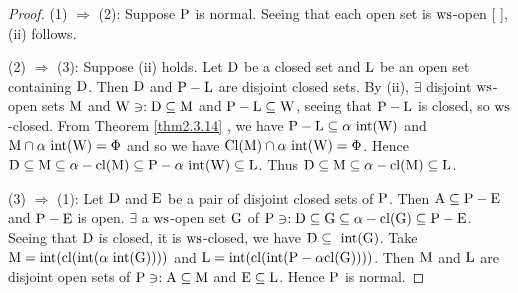 \begin{proof}
(1) $\Rightarrow$ (2): Suppose $\mathrm{P}$ is normal. Seeing that each open set is $\mathrm{ws}$-open [ ], (ii) follows.

(2) $\Rightarrow$ (3): Suppose (ii) holds. Let $\mathrm{D}$ be a closed set and $\mathrm{L}$ be an open set containing $\mathrm{D}$. Then $\mathrm{D}$ and $\mathrm{P} -\mathrm{L}$ are disjoint closed sets. By (ii), $\exists$  disjoint $\mathrm{ws}$-open sets $\mathrm{M}$ and $\mathrm{W} \ni: \mathrm{D}\subseteq \mathrm{M}$ and $\mathrm{P}-\mathrm{L} \subseteq \mathrm{W}$, seeing that $\mathrm{P} -\mathrm{L}$ is closed, so $\mathrm{ws}$-closed. From Theorem \ref{thm2.3.14} \cite{key2}, we have $\mathrm{P} -\mathrm{L} \subseteq \alpha\text{ int} (\mathrm{W})$ and $\mathrm{M} \cap \alpha\text{ int} (\mathrm{W}) = \Phi$ and so we have $\mathrm{Cl} (\mathrm{M}) \cap \alpha\text{ int} (\mathrm{W}) = \Phi$. Hence $\mathrm{D} \subseteq \mathrm{M} \subseteq \alpha-\mathrm{cl}(\mathrm{M}) \subseteq \mathrm{P} -\alpha\text{ int}(\mathrm{W}) \subseteq \mathrm{L}$. Thus $\mathrm{D}\subseteq\mathrm{M} \subseteq \alpha-\mathrm{cl} (\mathrm{M}) \subseteq \mathrm{L}$.

(3) $\Rightarrow$ (1): Let $\mathrm{D}$ and $\mathrm{E}$ be a pair of disjoint closed sets of $\mathrm{P}$. Then $\mathrm{A} \subseteq \mathrm{P}-\mathrm{E}$ and $\mathrm{P}-\mathrm{E}$ is open. $\exists$ a $\mathrm{ws}$-open set $\mathrm{G}$ of $\mathrm{P} \ni: \mathrm{D} \subseteq \mathrm{G} \subseteq \alpha-\mathrm{cl} (\mathrm{G}) \subseteq \mathrm{P}-\mathrm{E}$. Seeing that $\mathrm{D}$ is closed, it is $\mathrm{ws}$-closed, we have $\mathrm{D} \subseteq \text{ int} (\mathrm{G})$. Take $\mathrm{M} =\text{int} (\mathrm{cl} (\text{int} (\alpha\text{ int} (\mathrm{G}))))$ and $\mathrm{L} = \text{int} (\mathrm{cl} (\text{int}(\mathrm{P}-\alpha\mathrm{cl} (\mathrm{G}))))$. Then $\mathrm{M}$ and $\mathrm{L}$ are disjoint open sets of $\mathrm{P} \ni: \mathrm{A} \subseteq \mathrm{M}$ and $\mathrm{E} \subseteq \mathrm{L}$. Hence $\mathrm{P}$ is normal.
\end{proof}

